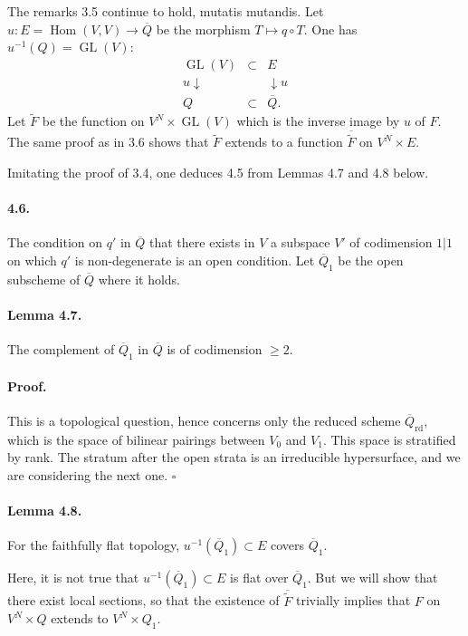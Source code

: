 \documentclass[11pt]{article}
\newcommand{\Hom}{\operatorname{Hom}}
\newcommand{\GL}{\operatorname{GL}}
\newcommand{\rd}{\mathrm{rd}}
\newcommand{\barQ}{\overline Q}
\begin{document}
The remarks 3.5 continue to hold, mutatis mutandis. Let $u:E=\Hom(V,V)\to\barQ$ be the morphism $T\mapsto q\circ T$. One has $u^{-1}(Q)=\GL(V)$:
\begin{equation}
\label{eq:451}
\begin{array}{ccc}
\GL(V)&\subset&E\\
\scriptstyle u\downarrow&&\downarrow\scriptstyle u\\
Q&\subset&\barQ.
\end{array}
\end{equation}
Let $\widetilde F$ be the function on $V^N\times\GL(V)$ which is the inverse image by $u$ of $F$. The same proof as in 3.6 shows that $\widetilde F$ extends to a function $\overline{\widetilde F}$ on $V^N\times E$.

Imitating the proof of 3.4, one deduces 4.5 from Lemmas 4.7 and 4.8 below.

\paragraph{4.6.}
The condition on $q'$ in $\barQ$ that there exists in $V$ a subspace $V'$ of codimension $1|1$ on which $q'$ is non-degenerate is an open condition. Let $\barQ_1$ be the open subscheme of $\barQ$ where it holds.

\paragraph{Lemma 4.7.}
The complement of $\barQ_1$ in $\barQ$ is of codimension $\ge2$.

\paragraph{Proof.}
This is a topological question, hence concerns only the reduced scheme $\barQ_{\rd}$, which is the space of bilinear pairings between $V_0$ and $V_1$. This space is stratified by rank. The stratum after the open strata is an irreducible hypersurface, and we are considering the next one. \hfill $\square$

\paragraph{Lemma 4.8.}
For the faithfully flat topology, $u^{-1}(\barQ_1)\subset E$ covers $\barQ_1$.

Here, it is not true that $u^{-1}(\barQ_1)\subset E$ is flat over $\barQ_1$. But we will show that there exist local sections, so that the existence of $\overline{\widetilde F}$ trivially implies that $F$ on $V^N\times Q$ extends to $V^N\times Q_1$.
\end{document}
